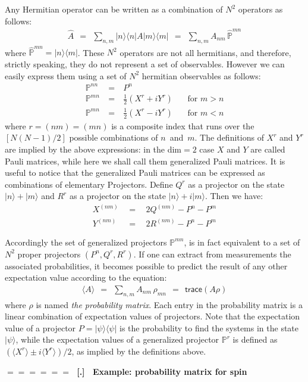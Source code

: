 \documentclass[onecolumn,fleqn]{revtex4}
\newcommand{\trc}{\mathsf{trace}}
\newcommand{\beq}{\begin{eqnarray}}
\newcommand{\eeq}{\end{eqnarray}}
\renewcommand{\thesubsection}{\arabic{subsection}}
\renewcommand{\thesubsubsection}{\arabic{subsubsection}}
\newcommand{\sheadC}[1]
{
\addtocounter{subsubsection}{1}
\vspace{5mm}
{\Large\bf $=\!=\!=\!=\!=\!=\;$ [\thesubsection.\thesubsubsection] \ #1}  
\nopagebreak
\phantomsection
}
\begin{document}
Any Hermitian operator can be written 
as a combination of ${N^2}$ operators 
as follows:
\beq
\hat{A} \ \ = \ \ \sum_{n,m} |n \rangle \langle n|A|m \rangle \langle m| 
\ \ = \ \ \sum_{n,m}A_{nm} \, \hat{\mathbb{P}}^{mn} 
\eeq
where ${\hat{\mathbb{P}}^{mn} = |n \rangle \langle m|}$. 
These $N^2$ operators are not all hermitians, 
and therefore, strictly speaking, they do not represent a set of observables.  
However we can easily express them using a set of $N^2$ hermitian 
observables as follows:
\beq
\mathbb{P}^{nn} & \ = \ &  P^{n}   \\
\mathbb{P}^{mn} & \ = \ &  \frac{1}{2}(X^{r} + iY^{r})  \ \ \ \ \ \ \ \  \mbox{for $m{>}n$} \\
\mathbb{P}^{mn} & \ = \ &  \frac{1}{2}(X^{r} - iY^{r})  \ \ \ \  \ \ \ \ \mbox{for $m{<}n$} 
\eeq
where $r=(nm)=(mn)$ is a composite index that runs over 
the $[N(N{-}1)/2]$ possible combinations of $n$~and~$m$. 
The definitions of $X^{r}$ and $Y^{r}$ are 
implied by the above expressions:
in the dim$=2$ case $X$ and $Y$ are called Pauli matrices, 
while here we shall call them generalized Pauli matrices. 
It is useful to notice that the generalized Pauli matrices
can be expressed as combinations of elementary Projectors. 
Define $Q^{r}$ as a projector on the state  ${|n\rangle+|m\rangle}$
and $R^{r}$ as a projector on the state ${|n\rangle+i|m\rangle}$.
Then we have:
\beq
X^{(nm)} \ \ &=& \ \ 2Q^{(nm)}-P^{n}-P^{m} \\
Y^{(nm)} \ \ &=& \ \ 2R^{(nm)}-P^{n}-P^{m}
\eeq

Accordingly the set of generalized projectors ${\mathbb{P}}^{mn}$, 
is in fact equivalent to a set of $N^2$ 
proper projectors ${(P^{n},Q^{r},R^{r})}$.   
If one can extract from measurements the associated probabilities, 
it becomes possible to predict the result of any other expectation value  
according to the equation:
\beq
\langle A \rangle \ \ =  \ \ \sum_{n,m}A_{nm} \, \rho_{mn} \ \ = \ \ \trc(A\rho) 
\eeq
where ${\rho}$ is named {\em the probability matrix}. Each entry in the probability 
matrix is a linear combination of expectation values of projectors.  
Note that the expectation value of a projector $P=|\psi\rangle\langle\psi|$ 
is the probability to find the systems in the state $|\psi\rangle$, 
while the expectation values of a generalized projector $\mathbb{P}^{r}$ 
is defined as $(\langle X^{r} \rangle \pm i \langle Y^{r}\rangle )/2$, 
as implied by the definitions above. 


 
\sheadC{Example: probability matrix for spin}
\end{document}
